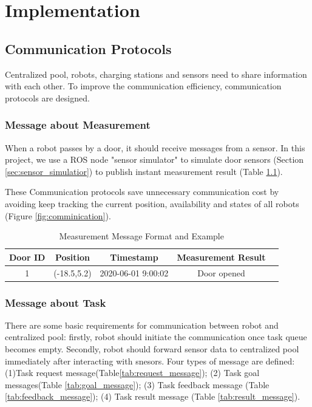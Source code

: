 \chapter{Implementation}


\section{Communication Protocols}


Centralized pool, robots, charging stations and sensors need to share information with each other.
To improve the communication efficiency, communication protocols are designed. 

\subsection{Message about Measurement}
\label{sec:measurement_message}
When a robot passes by a door, it should receive messages from a sensor. In this project, we use a ROS node "sensor simulator" to simulate door sensors (Section \ref{sec:sensor_simulatior}) to publish instant measurement result (Table \ref{tab:sensor_message}).

These Communication protocols save unnecessary communication cost by avoiding keep tracking the current position, availability and states of all robots (Figure \ref{fig:comminication}).

\begin{table}[htb]
\centering
\begin{tabular}{|c|c|c|c|c|} 
\hline
Door ID  & Position& Timestamp & Measurement Result \\
\hline\hline
1&(-18.5,5.2) & 2020-06-01 9:00:02 & Door opened \\ [1ex] 
\hline
\end{tabular}
\caption{Measurement Message Format and Example}
\label{tab:sensor_message}
\end{table}
	

\subsection{Message about Task}
\label{sec:task_message}
There are some basic requirements for communication between robot and centralized pool: firstly, robot should initiate the communication once task queue becomes empty. 
Secondly, robot should forward sensor data to centralized pool immediately after interacting with snesors. 
Four types of message are defined: 
(1)Task request message(Table\ref{tab:request_message}); (2) Task goal messages(Table \ref{tab:goal_message}); (3) Task feedback message (Table \ref{tab:feedback_message}); (4) Task result message (Table \ref{tab:result_message}). 

